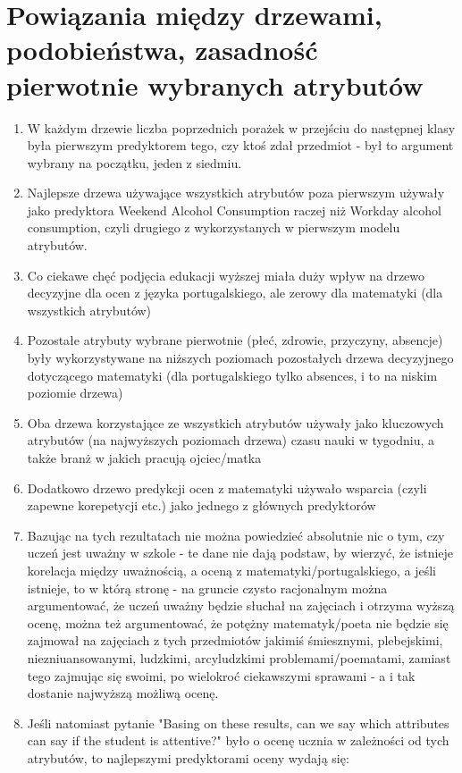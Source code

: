 \documentclass[12pt]{article}
\begin{document}
\section{Powiązania między drzewami, podobieństwa, zasadność pierwotnie wybranych atrybutów}
\begin{enumerate}
	\item W każdym drzewie liczba poprzednich porażek w przejściu do następnej klasy była pierwszym predyktorem tego, czy ktoś zdał przedmiot - był to argument wybrany na początku, jeden z siedmiu.
	\item Najlepsze drzewa używające wszystkich atrybutów poza pierwszym używały jako predyktora Weekend Alcohol Consumption raczej niż Workday alcohol consumption, czyli drugiego z wykorzystanych w pierwszym modelu atrybutów.
	\item Co ciekawe chęć podjęcia edukacji wyższej miała duży wpływ na drzewo decyzyjne dla ocen z języka portugalskiego, ale zerowy dla matematyki (dla wszystkich atrybutów)
	\item Pozostałe atrybuty wybrane pierwotnie (płeć, zdrowie, przyczyny, absencje) były wykorzystywane na niższych poziomach pozostałych drzewa decyzyjnego dotyczącego matematyki (dla portugalskiego tylko absences, i to na niskim poziomie drzewa)
	\item Oba drzewa korzystające ze wszystkich atrybutów używały jako kluczowych atrybutów (na najwyższych poziomach drzewa) czasu nauki w tygodniu, a także branż w jakich pracują ojciec/matka
	\item Dodatkowo drzewo predykcji ocen z matematyki używało wsparcia (czyli zapewne korepetycji etc.) jako jednego z głównych predyktorów
	\item Bazując na tych rezultatach nie można powiedzieć absolutnie nic o tym, czy uczeń jest uważny w szkole - te dane nie dają podstaw, by wierzyć, że istnieje korelacja między uważnością, a oceną z matematyki/portugalskiego, a jeśli istnieje, to w którą stronę - na gruncie czysto racjonalnym można argumentować, że uczeń uważny będzie słuchał na zajęciach i otrzyma wyższą ocenę, można też argumentować, że potężny matematyk/poeta nie będzie się zajmował na zajęciach z tych przedmiotów jakimiś śmiesznymi, plebejskimi, niezniuansowanymi, ludzkimi, arcyludzkimi problemami/poematami, zamiast tego zajmując się swoimi, po wielokroć ciekawszymi sprawami - a i tak dostanie najwyższą możliwą ocenę.
	\item Jeśli natomiast pytanie "Basing on these results, can we say
	which attributes can say if the student is attentive?" było o ocenę ucznia w zależności od tych atrybutów, to najlepszymi predyktorami oceny wydają się:

\end{enumerate}
\end{document}
